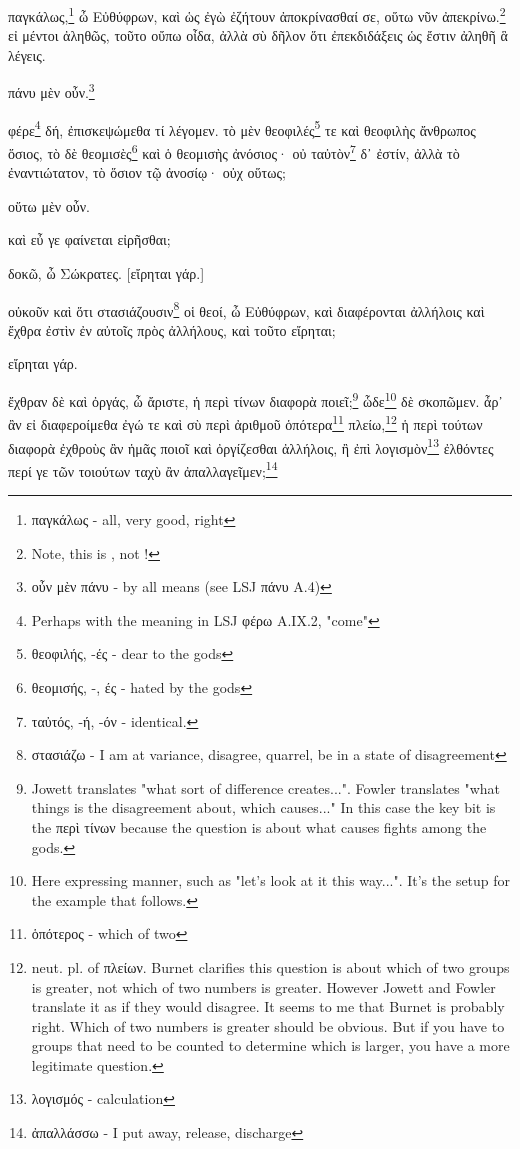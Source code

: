 


παγκάλως,\footnote{παγκάλως - all, very good, right}
ὦ
Εὐθύφρων,
καὶ
ὡς
ἐγὼ
ἐζήτουν
ἀποκρίνασθαί
σε,
οὕτω
νῦν
ἀπεκρίνω.\footnote{Note, this is , not !}
εἰ
μέντοι
ἀληθῶς,
τοῦτο
οὔπω
οἶδα,
ἀλλὰ
σὺ
δῆλον
ὅτι
ἐπεκδιδάξεις
ὡς
ἔστιν
ἀληθῆ
ἃ
λέγεις.

πάνυ
μὲν
οὖν.\footnote{οὖν μὲν πάνυ - by all means (see LSJ πάνυ A.4)}

φέρε\footnote{Perhaps with the meaning in LSJ φέρω A.IX.2, "come"}
δή,
ἐπισκεψώμεθα
τί
λέγομεν.
τὸ
μὲν
θεοφιλές\footnote{θεοφιλής, -ές - dear to the gods}
τε
καὶ
θεοφιλὴς
ἄνθρωπος
ὅσιος,
τὸ
δὲ
θεομισὲς\footnote{θεομισής, -, ές - hated by the gods}
καὶ
ὁ
θεομισὴς
ἀνόσιος·
οὐ
ταὐτὸν\footnote{ταὐτός, -ή, -όν - identical.}
δ᾽
ἐστίν,
ἀλλὰ
τὸ
ἐναντιώτατον,
τὸ
ὅσιον
τῷ
ἀνοσίῳ·
οὐχ
οὕτως;

οὕτω
μὲν
οὖν.

καὶ
εὖ
γε
φαίνεται
εἰρῆσθαι;

\versification{[7b]}
δοκῶ,
ὦ
Σώκρατες.
[εἴρηται
γάρ.]

οὐκοῦν
καὶ
ὅτι
στασιάζουσιν\footnote{στασιάζω - I am at variance, disagree, quarrel, be in a state of disagreement}
οἱ
θεοί,
ὦ
Εὐθύφρων,
καὶ
διαφέρονται
ἀλλήλοις
καὶ
ἔχθρα
ἐστὶν
ἐν
αὐτοῖς
πρὸς
ἀλλήλους,
καὶ
τοῦτο
εἴρηται;

εἴρηται
γάρ.

ἔχθραν
δὲ
καὶ
ὀργάς,
ὦ
ἄριστε,
ἡ
περὶ
τίνων
διαφορὰ
ποιεῖ;\footnote{Jowett translates "what sort of difference creates...". Fowler translates "what things is the disagreement about, which causes..." In this case the key bit is the περὶ τίνων because the question is about what causes fights among the gods.}
ὧδε\footnote{Here expressing manner, such as "let's look at it this way...". It's the setup for the example that follows.}
δὲ
σκοπῶμεν.
ἆρ᾽
ἂν
εἰ
διαφεροίμεθα
ἐγώ
τε
καὶ
σὺ
περὶ
ἀριθμοῦ
ὁπότερα\footnote{ὁπότερος - which of two}
πλείω,\footnote{neut. pl. of πλείων. Burnet clarifies this question is about which of two groups is greater, not which of two numbers is greater. However Jowett and Fowler translate it as if they would disagree. It seems to me that Burnet is probably right. Which of two numbers is greater should be obvious. But if you have to groups that need to be counted to determine which is larger, you have a more legitimate question.}
ἡ
περὶ
τούτων
διαφορὰ
ἐχθροὺς
ἂν
ἡμᾶς
ποιοῖ
καὶ
ὀργίζεσθαι
ἀλλήλοις,
ἢ
ἐπὶ
λογισμὸν\footnote{λογισμός - calculation}
ἐλθόντες
περί
γε
τῶν
τοιούτων
ταχὺ
ἂν
\versification{[7c]}
ἀπαλλαγεῖμεν;\footnote{ἀπαλλάσσω - I put away, release, discharge}

